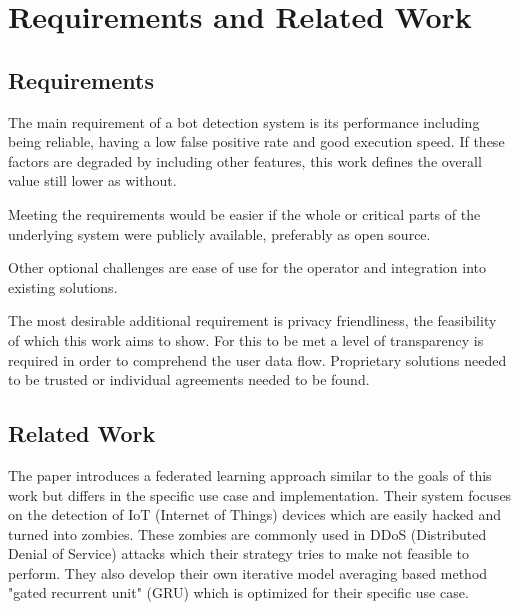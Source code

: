 \documentclass[
    fontsize=12pt,
    headings=small,
    parskip=half,           %
    bibliography=totoc,
    numbers=noenddot,       %
    open=any,               %
    final                   %
]{scrreprt}
\begin{document}
\chapter{Requirements and Related Work}


\section{Requirements}

The main requirement of a bot detection system is its performance including being reliable, having a low false positive rate and good execution speed. If these factors are degraded by including other features, this work defines the overall value still lower as without.

Meeting the requirements would be easier if the whole or critical parts of the underlying system were publicly available, preferably as open source.

Other optional challenges are ease of use for the operator and integration into existing solutions.

The most desirable additional requirement is privacy friendliness, the feasibility of which this work aims to show. For this to be met a level of transparency is required in order to comprehend the user data flow. Proprietary solutions needed to be trusted or individual agreements needed to be found.

\section{Related Work}

The paper \cite{LiJi2021} introduces a federated learning approach similar to the goals of this work but differs in the specific use case and implementation. Their system focuses on the detection of IoT (Internet of Things) devices which are easily hacked and turned into zombies. These zombies are commonly used in DDoS (Distributed Denial of Service) attacks which their strategy tries to make not feasible to perform. They also develop their own iterative model averaging based method "gated recurrent unit" (GRU) which is optimized for their specific use case.
\end{document}
